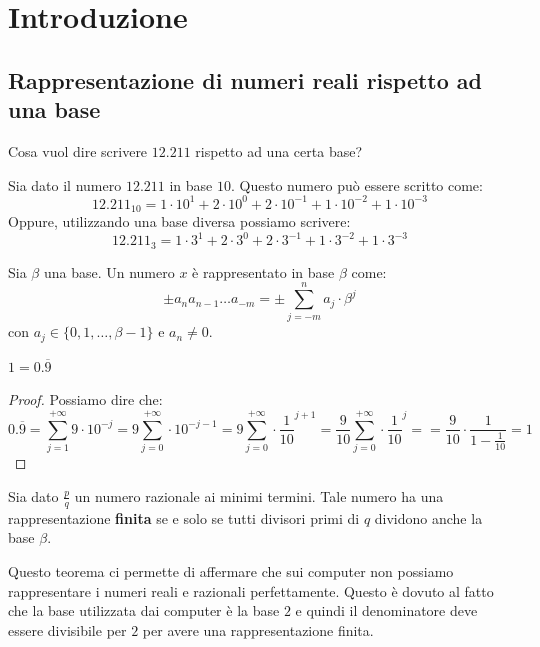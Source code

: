 \chapter{Introduzione}
\section{Rappresentazione di numeri reali rispetto ad una base}
\begin{esempio}
    Cosa vuol dire scrivere $12.211$ rispetto ad una certa base?

    Sia dato il numero $12.211$ in base $10$. Questo numero può essere scritto
    come:
    \begin{equation*}
        12.211_{10} = 1\cdot 10^1+2\cdot 10^0 +2 \cdot 10^{-1} + 1 \cdot 10^{-2}
        + 1 \cdot 10^{-3}
    \end{equation*}
    Oppure, utilizzando una base diversa possiamo scrivere:
    \begin{equation*}
        12.211_{3} = 1\cdot 3^1+2\cdot 3^0 +2 \cdot 3^{-1} + 1 \cdot 3^{-2}
        + 1 \cdot 3^{-3}
    \end{equation*}
\end{esempio}
\begin{definizione}
    Sia $\beta$ una base. Un numero $x$ è rappresentato in base $\beta$ come:
    \begin{equation}
        \pm a_n a_{n-1} \dots a_{-m} = \pm \sum_{j = -m}^{n} a_j \cdot \beta^j
    \end{equation}
    con $a_j \in \{0, 1, \dots, \beta-1\}$ e $a_n \neq 0$.
\end{definizione}
\begin{teorema}
    $1=0.\overline{9}$
    \begin{proof}
        Possiamo dire che:
        \begin{equation*}
            0.\overline{9} = \sum_{j = 1}^{+ \infty} 9 \cdot 10^{-j} = 9
            \sum_{j=0}^{+\infty} \cdot 10^{-j-1} = 9 \sum_{j = 0}^{+\infty} \cdot
            \frac{1}{10}^{j+1} = \frac{9}{10} \sum _{j=0}^{+\infty} \cdot \frac{1}{10}^{j} =
            = \frac{9}{10} \cdot \frac{1}{1-\frac{1}{10}} = 1
        \end{equation*}
    \end{proof}
\end{teorema}
\begin{teorema}
    Sia dato $\frac{p}{q}$ un numero razionale ai minimi termini. Tale numero ha
    una rappresentazione \textbf{finita} se e solo se tutti divisori primi di $q$
    dividono anche la base $\beta$.
\end{teorema}
Questo teorema ci permette di affermare che sui computer non possiamo
rappresentare i numeri reali e razionali perfettamente. Questo è dovuto al fatto
che la base utilizzata dai computer è la base $2$ e quindi il denominatore deve
essere divisibile per $2$ per avere una rappresentazione finita.
